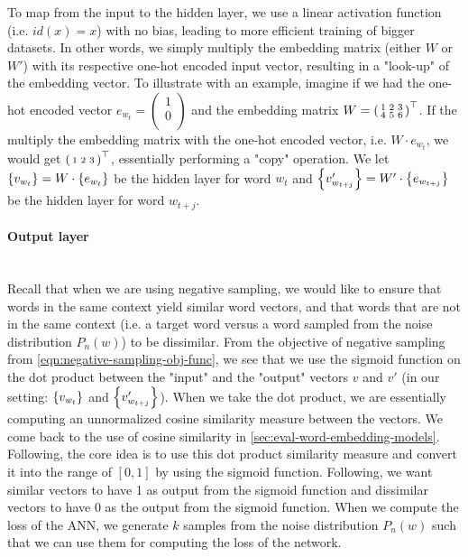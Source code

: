 To map from the input to the hidden layer, we use a linear activation function (i.e. $id(x) = x$) with no bias, leading to more efficient training of bigger datasets. In other words, we simply multiply the embedding matrix (either $W$ or $W'$) with its respective one-hot encoded input vector, resulting in a "look-up" of the embedding vector. To illustrate with an example, imagine if we had the one-hot encoded vector $e_{w_t} = \left( \begin{smallmatrix}
    1\\
    0\\
\end{smallmatrix} \right)$ and the embedding matrix $W = {\left( \begin{smallmatrix}
    1 & 2 & 3\\
    4 & 5 & 6\\
\end{smallmatrix} \right)}^\top$. If the multiply the embedding matrix with the one-hot encoded vector, i.e. $W \cdot e_{w_t}$, we would get ${\left( \begin{smallmatrix}
    1 & 2 & 3\\
\end{smallmatrix} \right)}^\top$, essentially performing a "copy" operation. We let $\left\{v_{w_t}\right\} = W \cdot \left\{e_{w_t}\right\}$ be the hidden layer for word $w_t$ and $\left\{v'_{w_{t+j}}\right\} = W' \cdot \left\{e_{w_{t+j}}\right\}$ be the hidden layer for word $w_{t+j}$. 

\paragraph*{Output layer}\mbox{} \\
Recall that when we are using negative sampling, we would like to ensure that words in the same context yield similar word vectors, and that words that are not in the same context (i.e. a target word versus a word sampled from the noise distribution $P_n(w)$) to be dissimilar. From the objective of negative sampling from \cref{eqn:negative-sampling-obj-func}, we see that we use the sigmoid function on the dot product between the "input" and the "output" vectors $v$ and $v'$ (in our setting: $\left\{v_{w_t}\right\}$ and $\left\{v'_{w_{t+j}}\right\}$). When we take the dot product, we are essentially computing an unnormalized cosine similarity measure between the vectors. We come back to the use of cosine similarity in \cref{sec:eval-word-embedding-models}. Following, the core idea is to use this dot product similarity measure and convert it into the range of $[0, 1]$ by using the sigmoid function. Following, we want similar vectors to have 1 as output from the sigmoid function and dissimilar vectors to have 0 as the output from the sigmoid function. When we compute the loss of the ANN, we generate $k$ samples from the noise distribution $P_n(w)$ such that we can use them for computing the loss of the network.

